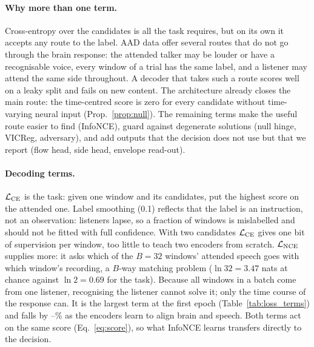 \documentclass[twoside]{article}
\begin{document}
\paragraph{Why more than one term.} Cross-entropy over the candidates is all the task
requires, but on its own it accepts any route to the label. AAD data offer several routes
that do not go through the brain response: the attended talker may be louder or have a
recognisable voice, every window of a trial has the same label, and a listener may attend the
same side throughout. A decoder that takes such a route scores well on a leaky split and
fails on new content. The architecture already closes the main route: the time-centred
score is zero for every candidate without time-varying neural input (Prop.~\ref{prop:null}).
The remaining terms make the useful route easier to find (InfoNCE), guard against
degenerate solutions (null hinge, VICReg, adversary), and add outputs that the decision does
not use but that we report (flow head, side head, envelope read-out).

\paragraph{Decoding terms.} $\mathcal L_{\rm CE}$ is the task: given one window and its
candidates, put the highest score on the attended one. Label smoothing (0.1) reflects that
the label is an instruction, not an observation: listeners lapse, so a fraction of windows
is mislabelled and should not be fitted with full confidence. With two candidates
$\mathcal L_{\rm CE}$ gives one bit of supervision per window, too little to teach two
encoders from scratch. $\mathcal L_{\rm NCE}$ supplies more: it asks which of the $B=32$
windows' attended speech goes with which window's recording, a $B$-way matching problem
($\ln 32=3.47$ nats at chance against $\ln 2=0.69$ for the task). Because all windows in a
batch come from one listener, recognising the listener cannot solve it; only the time
course of the response can. It is the largest term at the first epoch
(Table~\ref{tab:loss_terms}) and falls by \nceDropMin--\nceDropMax\% as the encoders learn to align
brain and speech. Both terms act on the same score (Eq.~\ref{eq:score}), so what InfoNCE
learns transfers directly to the decision.
\end{document}
